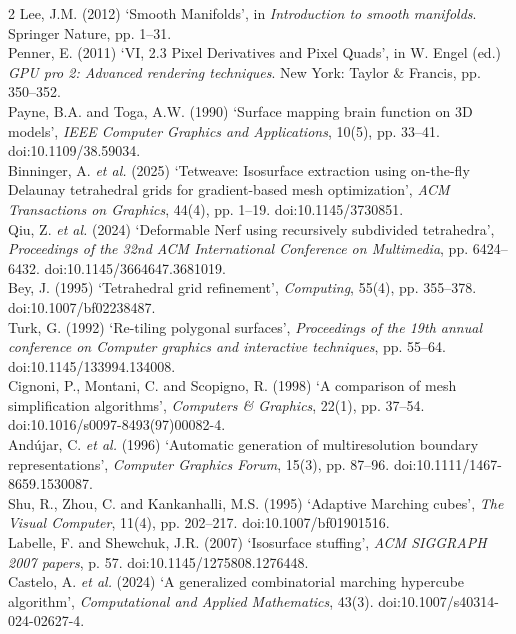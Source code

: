 \documentclass[]{article}
\begin{document}
\begin{multicols}{2}
Lee, J.M. (2012) `Smooth Manifolds', in \emph{Introduction to smooth manifolds}. Springer Nature, pp. 1--31.\medskip\\
Penner, E. (2011) `VI, 2.3 Pixel Derivatives and Pixel Quads', in W. Engel (ed.) \emph{GPU pro 2: Advanced rendering techniques}. New York: Taylor \& Francis, pp. 350--352.\medskip\\
Payne, B.A. and Toga, A.W. (1990) `Surface mapping brain function on 3D models', \emph{IEEE Computer Graphics and Applications}, 10(5), pp. 33--41. doi:10.1109/38.59034.\medskip\\
Binninger, A. \emph{et al.} (2025) `Tetweave: Isosurface extraction using on-the-fly Delaunay tetrahedral grids for gradient-based mesh optimization', \emph{ACM Transactions on Graphics}, 44(4), pp. 1--19. doi:10.1145/3730851.\medskip\\
Qiu, Z. \emph{et al.} (2024) `Deformable Nerf using recursively subdivided tetrahedra', \emph{Proceedings of the 32nd ACM International Conference on Multimedia}, pp. 6424--6432. doi:10.1145/3664647.3681019.\medskip\\
Bey, J. (1995) `Tetrahedral grid refinement', \emph{Computing}, 55(4), pp. 355--378. doi:10.1007/bf02238487.\medskip\\
Turk, G. (1992) `Re-tiling polygonal surfaces', \emph{Proceedings of the 19th annual conference on Computer graphics and interactive techniques}, pp. 55--64. doi:10.1145/133994.134008.\medskip\\
Cignoni, P., Montani, C. and Scopigno, R. (1998) `A comparison of mesh simplification algorithms', \emph{Computers \& Graphics}, 22(1), pp. 37--54. doi:10.1016/s0097-8493(97)00082-4.\medskip\\
Andújar, C. \emph{et al.} (1996) `Automatic generation of multiresolution boundary representations', \emph{Computer Graphics Forum}, 15(3), pp. 87--96. doi:10.1111/1467-8659.1530087.\medskip\\
Shu, R., Zhou, C. and Kankanhalli, M.S. (1995) `Adaptive Marching cubes', \emph{The Visual Computer}, 11(4), pp. 202--217. doi:10.1007/bf01901516.\medskip\\
Labelle, F. and Shewchuk, J.R. (2007) `Isosurface stuffing', \emph{ACM SIGGRAPH 2007 papers}, p. 57. doi:10.1145/1275808.1276448.\medskip\\
Castelo, A. \emph{et al.} (2024) `A generalized combinatorial marching hypercube algorithm', \emph{Computational and Applied Mathematics}, 43(3). doi:10.1007/s40314-024-02627-4.\medskip\\

\end{multicols}
\end{document}
